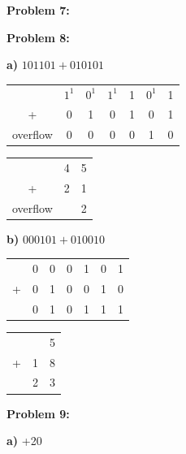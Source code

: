 \documentclass{article}
\begin{document}
\begin{center}
\begin{tabular}{ c|c|c|c|c|c|c|c|c }
        \end{tabular}
    \end{center}

    \textbf{Problem 7:}

    \quad\quad
    \noindent{}

    \textbf{Problem 8:}

    \quad \textbf{a)} $101101+010101$

    \begin{center}
        \begin{tabular}{ ccccccc }
            & $1^1$ & $0^1$ & $1^1$ & 1 & $0^1$ & 1 \\
            + & 0   & 1   & 0   & 1 & 0   & 1 \\
            \hline
            overflow & 0 & 0 & 0 & 0 & 1 & 0
        \end{tabular}
        \quad\quad 
        \begin{tabular}{ ccc }
            & 4 & 5 \\
            + & 2 & 1 \\
            \hline
            overflow & & 2
        \end{tabular}
    \end{center}

    \quad \textbf{b)} $000101 + 010010$

    \begin{center}
        \begin{tabular}{ ccccccc }
              & 0 & 0 & 0 & 1 & 0 & 1 \\
            + & 0 & 1 & 0 & 0 & 1 & 0 \\
            \hline
            & 0 & 1 & 0 & 1 & 1 & 1
        \end{tabular}
        \quad\quad 
        \begin{tabular}{ ccc }
            & & 5 \\
            + & 1 & 8 \\
            \hline
            & 2 & 3
        \end{tabular}
    \end{center}

    \textbf{Problem 9:}

    \quad \textbf{a)} +20

    \quad\quad {}
\end{document}
